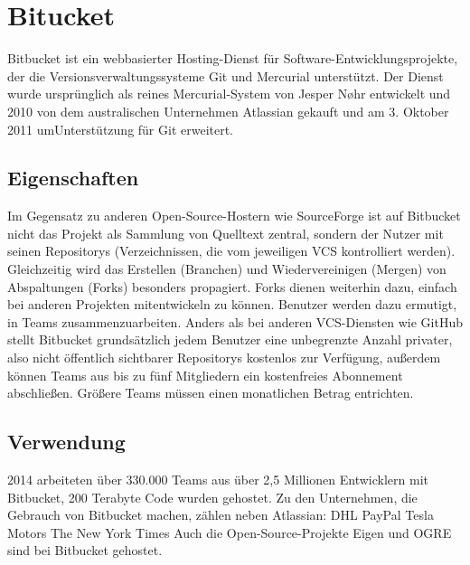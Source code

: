\section{Bitucket}
Bitbucket ist ein webbasierter Hosting-Dienst für Software-Entwicklungsprojekte, der die Versionsverwaltungssysteme Git und Mercurial unterstützt. Der Dienst wurde ursprünglich als reines Mercurial-System von Jesper Nøhr entwickelt und 2010 von dem australischen Unternehmen Atlassian gekauft und am 3. Oktober 2011 umUnterstützung für Git erweitert.
\subsection{Eigenschaften}
Im Gegensatz zu anderen Open-Source-Hostern wie SourceForge ist auf Bitbucket nicht das Projekt als Sammlung von Quelltext zentral, sondern der Nutzer mit seinen Repositorys (Verzeichnissen, die vom jeweiligen VCS kontrolliert werden). Gleichzeitig wird das Erstellen (Branchen) und Wiedervereinigen (Mergen) von Abspaltungen (Forks) besonders propagiert. Forks dienen weiterhin dazu, einfach bei anderen Projekten mitentwickeln zu können.
Benutzer werden dazu ermutigt, in Teams zusammenzuarbeiten. Anders als bei anderen VCS-Diensten wie GitHub stellt Bitbucket grundsätzlich jedem Benutzer eine unbegrenzte Anzahl privater, also nicht öffentlich sichtbarer Repositorys kostenlos zur Verfügung, außerdem können Teams aus bis zu fünf Mitgliedern ein kostenfreies Abonnement abschließen. Größere Teams müssen einen monatlichen Betrag entrichten.
\subsection{Verwendung}
2014 arbeiteten über 330.000 Teams aus über 2,5 Millionen Entwicklern mit Bitbucket, 200 Terabyte Code wurden gehostet. Zu den Unternehmen, die Gebrauch von Bitbucket machen, zählen neben Atlassian:
DHL
PayPal
Tesla Motors
The New York Times
Auch die Open-Source-Projekte Eigen und OGRE sind bei Bitbucket gehostet.
